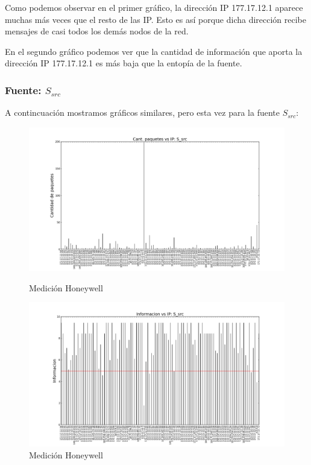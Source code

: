 Como podemos observar en el primer gráfico, la dirección IP 177.17.12.1 aparece muchas más veces que el resto de las IP. Esto es así porque dicha dirección recibe mensajes de casi todos los demás nodos de la red.

En el segundo gráfico podemos ver que la cantidad de información que aporta la dirección IP 177.17.12.1 es más baja que la entopía de la fuente.
 
 
\subsubsection{Fuente: $S_{src}$}

A contincuación mostramos gráficos similares, pero esta vez para la fuente $S_{src}$:

\begin{figure}[H]
   \begin{minipage}{0.5\linewidth}
     \includegraphics[width=\linewidth]{../imgs/red-alto-palermo_S_src_hist.png}
     \caption{Medición Honeywell}\label{fig:Alto-src-hist}
   \end{minipage}
  \hfill
   \begin{minipage}{0.5\linewidth}
     \includegraphics[width=\linewidth]{../imgs/red-alto-palermo_S_src_info.png}
     \caption{Medición Honeywell}\label{fig:Alto-src-info}
   \end{minipage}
 \end{figure}


